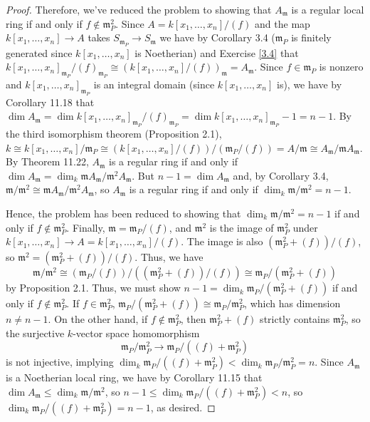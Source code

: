 \begin{proof}
Therefore, we've reduced the problem to showing that $A_{\mathfrak{m}}$ is a regular local ring if and only if $f \not\in \mathfrak{m}_P^2$. Since
$A = k[x_1,\ldots,x_n]/(f)$ and the map $k[x_1,\ldots,x_n] \to A$ takes $S_{\mathfrak{m}_P} \to S_{\mathfrak{m}}$ we have by Corollary 3.4 ($\mathfrak{m}_P$
is finitely generated since $k[x_1,\ldots,x_n]$ is Noetherian) and Exercise \ref{3.4} that 
$k[x_1,\ldots,x_n]_{\mathfrak{m}_P}/(f)_{\mathfrak{m}_P} \cong (k[x_1,\ldots,x_n]/(f))_{\mathfrak{m}} = A_{\mathfrak{m}}$. 
Since $f \in \mathfrak{m}_P$ is nonzero and $k[x_1,\ldots,x_n]_{\mathfrak{m}_P}$ is an integral domain (since $k[x_1,\ldots,x_n]$ is), we have by Corollary 11.18 
that $\dim A_{\mathfrak{m}} = \dim k[x_1,\ldots,x_n]_{\mathfrak{m}_P}/(f)_{\mathfrak{m}_P} = \dim k[x_1,\ldots,x_n]_{\mathfrak{m}_P} - 1 = n - 1$.
By the third isomorphism theorem (Proposition 2.1), $k \cong k[x_1,\ldots,x_n]/\mathfrak{m}_P \cong (k[x_1,\ldots,x_n]/(f))/(\mathfrak{m}_P/(f)) = A/\mathfrak{m}
\cong A_{\mathfrak{m}}/\mathfrak{m}A_{\mathfrak{m}}$. By Theorem 11.22, $A_{\mathfrak{m}}$ is a regular ring if and only if
$\dim A_{\mathfrak{m}} = \dim_k \mathfrak{m}A_{\mathfrak{m}}/\mathfrak{m}^2A_{\mathfrak{m}}$. But $n - 1 = \dim A_{\mathfrak{m}}$ and,
by Corollary 3.4, $\mathfrak{m}/\mathfrak{m}^2 \cong \mathfrak{m}A_{\mathfrak{m}}/\mathfrak{m}^2A_{\mathfrak{m}}$, so $A_{\mathfrak{m}}$ is a regular ring
if and only if $\dim_k \mathfrak{m}/\mathfrak{m}^2 = n - 1$.

Hence, the problem has been reduced to showing that $\dim_k \mathfrak{m}/\mathfrak{m}^2 = n - 1$ if and only if $f \not\in \mathfrak{m}_P^2$. Finally,
$\mathfrak{m} = \mathfrak{m}_P/(f)$, and $\mathfrak{m}^2$ is the image of $\mathfrak{m}_P^2$ under $k[x_1,\ldots,x_n] \to A = k[x_1,\ldots,x_n]/(f)$. The image
is also $(\mathfrak{m}_P^2 + (f))/(f)$, so $\mathfrak{m}^2 = (\mathfrak{m}_P^2 + (f))/(f)$. Thus, we have
$$\mathfrak{m}/\mathfrak{m}^2 \cong (\mathfrak{m}_P/(f))/((\mathfrak{m}_P^2 + (f))/(f)) \cong \mathfrak{m}_P/(\mathfrak{m}_P^2 + (f))$$
by Proposition 2.1. Thus, we must show $n-1 = \dim_k \mathfrak{m}_P/(\mathfrak{m}_P^2 + (f))$ if and only if $f \not\in \mathfrak{m}_P^2$.
If $f \in \mathfrak{m}_P^2$, $\mathfrak{m}_P/(\mathfrak{m}_P^2 + (f)) \cong \mathfrak{m}_P/\mathfrak{m}_P^2$, which has dimension $n \neq n-1$. On the other hand,
if $f \not\in \mathfrak{m}_P^2$, then $\mathfrak{m}_P^2 + (f)$ strictly contains $\mathfrak{m}_P^2$, so the surjective $k$-vector space homomorphism
$$\mathfrak{m}_P/\mathfrak{m}_P^2 \to \mathfrak{m}_P/((f) + \mathfrak{m}_P^2)$$
is not injective, implying $\dim_k \mathfrak{m}_P/((f) + \mathfrak{m}_P^2) < \dim_k \mathfrak{m}_P/\mathfrak{m}_P^2 = n$. Since $A_{\mathfrak{m}}$ is a Noetherian local ring, 
we have by Corollary 11.15 that $\dim A_{\mathfrak{m}} \le \dim_k \mathfrak{m}/\mathfrak{m}^2$, so $n - 1 \le \dim_k \mathfrak{m}_P/((f) + \mathfrak{m}_P^2) < n$,
so $\dim_k \mathfrak{m}_P/((f) + \mathfrak{m}_P^2) = n-1$, as desired.
\end{proof}


